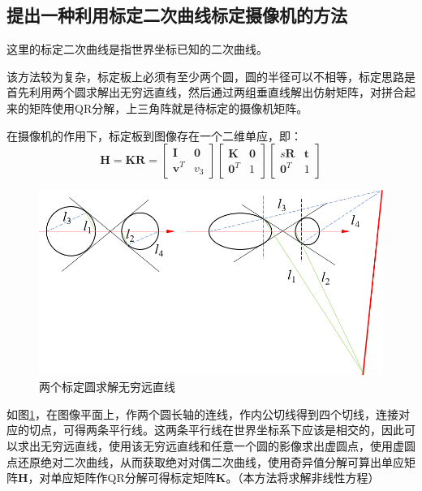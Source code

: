 \documentclass[11pt]{article}
\begin{document}
\subsection{提出一种利用标定二次曲线标定摄像机的方法}
这里的标定二次曲线是指世界坐标已知的二次曲线。\par
该方法较为复杂，标定板上必须有至少两个圆，圆的半径可以不相等，标定思路是首先利用两个圆求解出无穷远直线，然后通过两组垂直线解出仿射矩阵，对拼合起来的矩阵使用QR分解，上三角阵就是待标定的摄像机矩阵。\par
在摄像机的作用下，标定板到图像存在一个二维单应，即：
\begin{equation}
  \mathbf{H=KR}=\begin{bmatrix}
    \mathbf{I}&\mathbf{0}\\
    \mathbf{v}^T&v_3
  \end{bmatrix}\begin{bmatrix}
    \mathbf{K}&\mathbf{0}\\
    \mathbf{0}^T&1
  \end{bmatrix}\begin{bmatrix}
    s\mathbf{R}&\mathbf{t}\\
    \mathbf{0}^T&1
  \end{bmatrix}
  \label{eq:标定板到图像的二维单应}
\end{equation}\par
\begin{figure}[H]
  \centering
  \includegraphics[width=0.8\linewidth]{练习题5.png}
  \caption{两个标定圆求解无穷远直线}
\label{fig:两个标定圆求解无穷远直线}
\end{figure}\par
如图\ref{fig:两个标定圆求解无穷远直线}，在图像平面上，作两个圆长轴的连线，作内公切线得到四个切线，连接对应的切点，可得两条平行线。这两条平行线在世界坐标系下应该是相交的，因此可以求出无穷远直线，使用该无穷远直线和任意一个圆的影像求出虚圆点，使用虚圆点还原绝对二次曲线，从而获取绝对对偶二次曲线，使用奇异值分解可算出单应矩阵$\mathbf{H}$，对单应矩阵作QR分解可得标定矩阵$\mathbf{K}$。（本方法将求解非线性方程）\par
\end{document}
